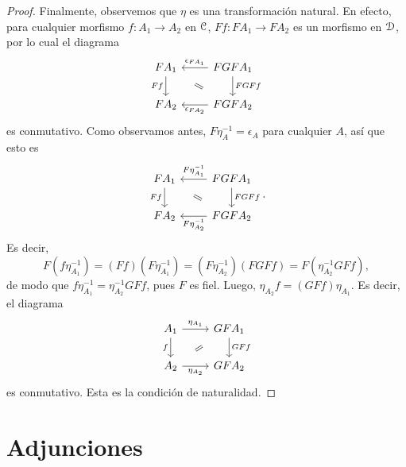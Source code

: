 \begin{proof}
    Finalmente, observemos que $\eta$ es una transformación natural.
    En efecto, para cualquier morfismo $f:A_1\to A_2$ en $\cal C$,
    $Ff:FA_1\to FA_2$ es un morfismo en $\cal D$, por lo cual el diagrama
    \[
        \begin{tikzcd}
            FA_1 \ar[d,"Ff"']
            & FGFA_1 \ar[l,"\epsilon_{FA_1}"'] \ar[d,"FGFf"] \\
            FA_2 & FGFA_2 \ar[l,"\epsilon_{FA_2}"]
            \com{1-1}{2-2}
        \end{tikzcd}
    \]
    es conmutativo.
    Como observamos antes, $F\eta_A^{-1}=\epsilon_A$ para cualquier $A$, así
    que esto es
    \[
        \begin{tikzcd}
            FA_1 \ar[d,"Ff"']
            & FGFA_1 \ar[l,"F\eta_{A_1}^{-1}"'] \ar[d,"FGFf"] \\
            FA_2 & FGFA_2 \ar[l,"F\eta_{A_2}^{-1}"]
            \com{1-1}{2-2}
        \end{tikzcd}
    .\]
    Es decir,
    \[
        F(f\eta_{A_1}^{-1})
        =(Ff)(F\eta_{A_1}^{-1})
        =(F\eta_{A_2}^{-1})(FGFf)
        =F(\eta_{A_2}^{-1}GFf)
    ,\]
    de modo que $f\eta_{A_1}^{-1}=\eta_{A_2}^{-1}GFf$, pues $F$ es fiel.
    Luego, $\eta_{A_2}f=(GFf)\eta_{A_1}$.
    Es decir, el diagrama
    \[
        \begin{tikzcd}
            A_1 \ar[d,"f"'] \ar[r,"\eta_{A_1}"]
            & GFA_1 \ar[d,"GFf"] \\
            A_2 \ar[r,"\eta_{A_2}"'] & GFA_2
            \com{1-2}{2-1}
        \end{tikzcd}
    \]
    es conmutativo.
    Esta es la condición de naturalidad.
\end{proof}

\section{Adjunciones}
\label{ss:adjunciones}

